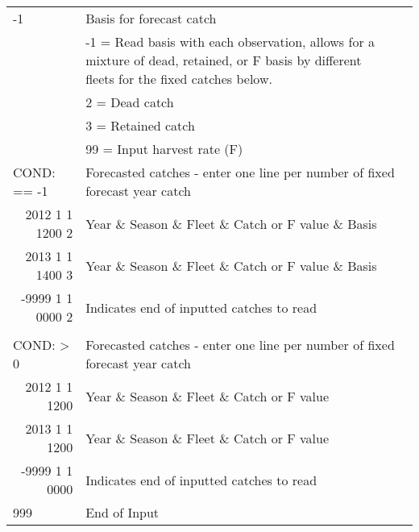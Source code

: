 \begin{landscape}
{\begin{longtable}{p{3.2cm} p{7cm} p{10.8cm}}
  \pagebreak
    -1 & Basis for forecast catch & \Tstrut\\
    & -1 = Read basis with each observation, allows for a mixture of dead, retained, or F basis by different fleets for the fixed catches below. & \\
    & 2 = Dead catch & \\
    & 3 = Retained catch & \\
    & 99 = Input harvest rate (F) & \Bstrut\\
    
  \hline
  \multicolumn{1}{l}{COND: == -1 }& \multicolumn{2}{l}{Forecasted catches - enter one line per number of fixed forecast year catch} \Tstrut\\
  \multicolumn{1}{r}{2012 1 1 1200 2}  & \multicolumn{2}{l}{Year \& Season \& Fleet \& Catch or F value \& Basis}  \\
  \multicolumn{1}{r}{2013 1 1 1400 3}  & \multicolumn{2}{l}{Year \& Season \& Fleet \& Catch or F value \& Basis}  \\
  \multicolumn{1}{r}{-9999 1 1 0000 2}  & \multicolumn{2}{l}{Indicates end of inputted catches to read}  \Bstrut\\
  \\
  \multicolumn{1}{l}{COND: > 0 }& \multicolumn{2}{l}{Forecasted catches - enter one line per number of fixed forecast year catch }\Tstrut\\
  \multicolumn{1}{r}{2012  1 1 1200}  & \multicolumn{2}{l}{Year \& Season \& Fleet \& Catch or F value}  \\
  \multicolumn{1}{r}{2013  1 1 1200}  & \multicolumn{2}{l}{Year \& Season \& Fleet \& Catch or F value}  \\
  \multicolumn{1}{r}{-9999 1 1 0000}  & \multicolumn{2}{l}{Indicates end of inputted catches to read}  \Bstrut\\
  
  \hline
  999 & End of Input & \Bstrut\\

  \end{longtable}}  
\end{landscape}

\hypertarget{Benchmark}{}
